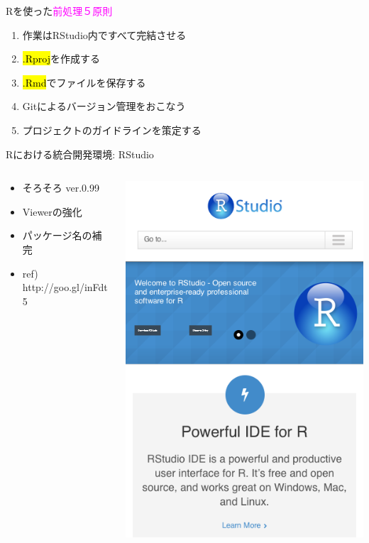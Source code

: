 \documentclass[ignorenonframetext,]{beamer}
\begin{document}
\begin{frame}{\faBullhorn Rを使った\textcolor{magenta}{前処理５原則}}

\begin{enumerate}
\def\labelenumi{\arabic{enumi}.}
\itemsep1pt\parskip0pt
\item
  作業はRStudio内ですべて完結させる
\item
  \hl{.Rproj}を作成する
\item
  \hl{.Rmd}でファイルを保存する
\item
  Gitによるバージョン管理をおこなう
\item
  プロジェクトのガイドラインを策定する
\end{enumerate}

\end{frame}

\begin{frame}{Rにおける統合開発環境: RStudio}

\begin{columns}[T]
  \begin{column}[T]{6cm}
    \begin{itemize}
      \item そろそろ ver.0.99
      \item Viewerの強化
      \item パッケージ名の補完
      \item \scriptsize{ref) \faLink http://goo.gl/inFdt5}
    \end{itemize}
  \end{column}
  \begin{column}[T]{4cm}
    \includegraphics[scale = 0.25]{images/webshot_rstudio_com.png}
  \end{column}
\end{columns}


\end{frame}
\end{document}
